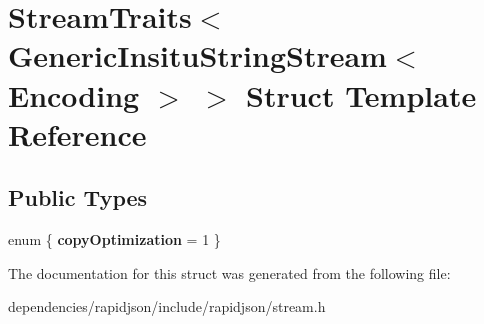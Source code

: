 \hypertarget{struct_stream_traits_3_01_generic_insitu_string_stream_3_01_encoding_01_4_01_4}{}\section{Stream\+Traits$<$ Generic\+Insitu\+String\+Stream$<$ Encoding $>$ $>$ Struct Template Reference}
\label{struct_stream_traits_3_01_generic_insitu_string_stream_3_01_encoding_01_4_01_4}
\subsection*{Public Types}
\begin{DoxyCompactItemize}
\item 
\mbox{\label{struct_stream_traits_3_01_generic_insitu_string_stream_3_01_encoding_01_4_01_4_a8cf1925a04aba7bd4dafb2fa6e73cc98}} 
enum \{ {\bfseries copy\+Optimization} = 1
 \}
\end{DoxyCompactItemize}


The documentation for this struct was generated from the following file\+:\begin{DoxyCompactItemize}
\item 
dependencies/rapidjson/include/rapidjson/stream.\+h\end{DoxyCompactItemize}
